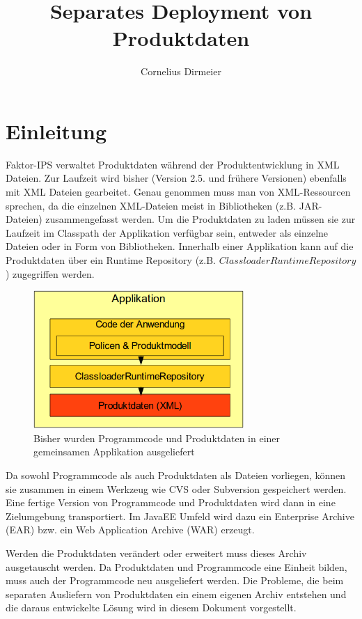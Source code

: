 \documentclass[headsepline=true, footsepline=true]{scrartcl}
\title{Separates Deployment von Produktdaten}
\author{Cornelius Dirmeier}
\begin{document}
\maketitle

\section{Einleitung}

Faktor-IPS verwaltet Produktdaten während der Produktentwicklung in XML Dateien.
Zur Laufzeit wird bisher (Version 2.5. und frühere Versionen) ebenfalls mit XML
Dateien gearbeitet. Genau genommen muss man von XML-Ressourcen sprechen, da die
einzelnen XML-Dateien meist in Bibliotheken (z.B. JAR-Dateien) zusammengefasst
werden. Um die Produktdaten zu laden müssen sie zur Laufzeit im Classpath der
Applikation verfügbar sein, entweder als einzelne Dateien oder in Form von
Bibliotheken. Innerhalb einer Applikation kann auf die Produktdaten über ein
Runtime Repository (z.B. $ClassloaderRuntimeRepository$) zugegriffen werden.

\begin{figure}[htb] \centering
\includegraphics[width=8cm]{./pics/old_architecture.png}
\caption{Bisher wurden Programmcode und Produktdaten in einer gemeinsamen
Applikation ausgeliefert}
\label{old_architecture}
\end{figure}

Da sowohl Programmcode als auch Produktdaten als Dateien vorliegen, können sie
zusammen in einem Werkzeug wie CVS oder Subversion gespeichert werden. Eine
fertige Version von Programmcode und Produktdaten wird dann in eine Zielumgebung
transportiert. Im JavaEE Umfeld wird dazu ein Enterprise Archive (EAR) bzw. ein
Web Application Archive (WAR) erzeugt.

Werden die Produktdaten verändert oder erweitert muss dieses Archiv ausgetauscht
werden. Da Produktdaten und Programmcode eine Einheit bilden, muss auch der
Programmcode neu ausgeliefert werden. Die Probleme, die beim separaten
Ausliefern von Produktdaten ein einem eigenen Archiv entstehen und die daraus
entwickelte Lösung wird in diesem Dokument vorgestellt.
\end{document}

